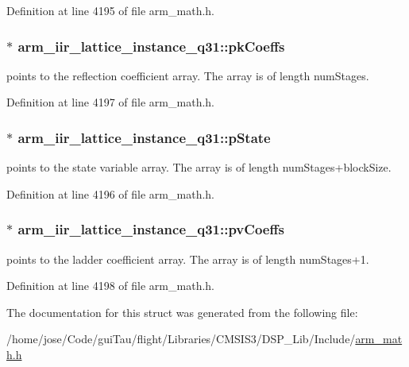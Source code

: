 Definition at line 4195 of file arm\-\_\-math.\-h.

\hypertarget{structarm__iir__lattice__instance__q31_a1d30aa16aac7722936ea9dee59211863}{
\subsubsection[{pk\-Coeffs}]{$\ast$ arm\-\_\-iir\-\_\-lattice\-\_\-instance\-\_\-q31\-::pk\-Coeffs}}\label{structarm__iir__lattice__instance__q31_a1d30aa16aac7722936ea9dee59211863}
points to the reflection coefficient array. The array is of length num\-Stages. 

Definition at line 4197 of file arm\-\_\-math.\-h.

\hypertarget{structarm__iir__lattice__instance__q31_a941282745effd26a889fbfadf4b95e6a}{
\subsubsection[{p\-State}]{$\ast$ arm\-\_\-iir\-\_\-lattice\-\_\-instance\-\_\-q31\-::p\-State}}\label{structarm__iir__lattice__instance__q31_a941282745effd26a889fbfadf4b95e6a}
points to the state variable array. The array is of length num\-Stages+block\-Size. 

Definition at line 4196 of file arm\-\_\-math.\-h.

\hypertarget{structarm__iir__lattice__instance__q31_a04507e2b982b1dfa97b7b55752dea6b9}{
\subsubsection[{pv\-Coeffs}]{$\ast$ arm\-\_\-iir\-\_\-lattice\-\_\-instance\-\_\-q31\-::pv\-Coeffs}}\label{structarm__iir__lattice__instance__q31_a04507e2b982b1dfa97b7b55752dea6b9}
points to the ladder coefficient array. The array is of length num\-Stages+1. 

Definition at line 4198 of file arm\-\_\-math.\-h.



The documentation for this struct was generated from the following file\-:\begin{DoxyCompactItemize}
\item 
/home/jose/\-Code/gui\-Tau/flight/\-Libraries/\-C\-M\-S\-I\-S3/\-D\-S\-P\-\_\-\-Lib/\-Include/\hyperlink{arm__math_8h}{arm\-\_\-math.\-h}\end{DoxyCompactItemize}
